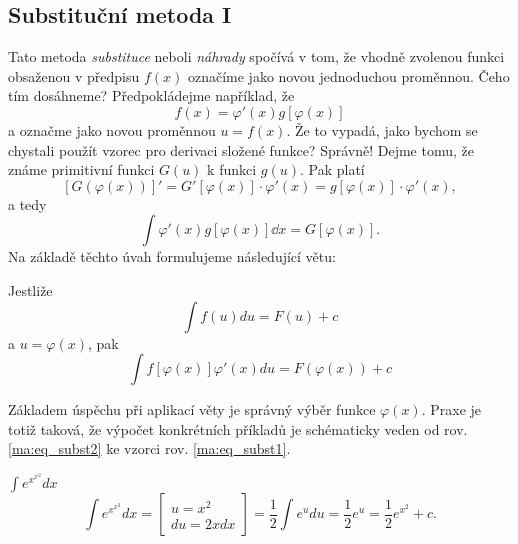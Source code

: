       
  
    \subsection{Substituční metoda I}
      Tato metoda \emph{substituce} neboli \emph{náhrady} spočívá v tom, že vhodně zvolenou funkci
      obsaženou v předpisu \(f(x)\) označíme jako novou jednoduchou proměnnou. Čeho tím dosáhneme?
      Předpokládejme například, že \[f(x)=\varphi'(x)g[\varphi(x)]\] a označme jako novou proměnnou
      \(u = f(x)\). Že to vypadá, jako bychom se chystali použít vzorec pro derivaci složené funkce?
      Správně! Dejme tomu, že známe primitivní funkci \(G(u)\) k funkci \(g(u)\). Pak platí
      \begin{equation*}
        \left[G\left(\varphi(x)\right)\right]' = G'\left[\varphi(x)\right]\cdot\varphi'(x) 
        = g\left[\varphi(x)\right]\cdot\varphi'(x),     
      \end{equation*}
      a tedy
      \begin{equation*}
        \int \varphi'(x) g\left[\varphi(x)\right]\dd{x} =  G\left[\varphi(x)\right]. 
      \end{equation*}      
      Na základě těchto úvah formulujeme následující větu:
      \begin{lemma}
        Jestliže
        \begin{equation}\label{ma:eq_subst1}
          \int{f(u)du}=F(u)+c
        \end{equation}
        a $u=\varphi(x)$, pak
        \begin{equation}\label{ma:eq_subst2}
            \int{f[\varphi(x)]\varphi'(x)du}=F(\varphi(x))+c
        \end{equation}
      \end{lemma}
  
      Základem úspěchu při aplikací věty je správný výběr funkce $\varphi(x)$. Praxe je totiž
      taková, že výpočet konkrétních příkladů je schématicky veden od rov. \ref{ma:eq_subst2} ke
      vzorci rov. \ref{ma:eq_subst1}.

      
      
      \begin{example}\label{ma:ex_sub_metoda}$\displaystyle\int{e^{x^{x^2}}dx}$
        \begin{equation*}
            \int{e^{x^{x^2}}dx}=
               \left[
                 \begin{array}{c}u=x^2 \\ du=2xdx\end{array}
               \right]=
               \frac{1}{2}\int{e^udu}=\frac{1}{2}e^u=\frac{1}{2}e^{x^2} + c.
        \end{equation*}
      \end{example}
      
